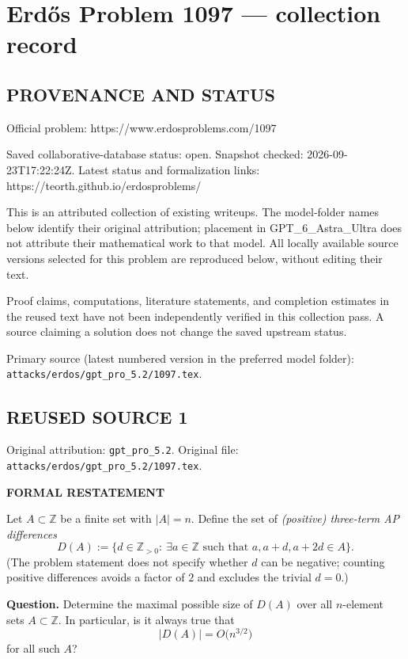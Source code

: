 \section*{Erd\H{o}s Problem 1097 --- collection record}

\subsection*{PROVENANCE AND STATUS}
Official problem: https://www.erdosproblems.com/1097

Saved collaborative-database status: open.
Snapshot checked: 2026-09-23T17:22:24Z.
Latest status and formalization links: https://teorth.github.io/erdosproblems/

This is an attributed collection of existing writeups. The model-folder names below identify their original attribution; placement in GPT\_6\_Astra\_Ultra does not attribute their mathematical work to that model. All locally available source versions selected for this problem are reproduced below, without editing their text.

Proof claims, computations, literature statements, and completion estimates in the reused text have not been independently verified in this collection pass. A source claiming a solution does not change the saved upstream status.

Primary source (latest numbered version in the preferred model folder): \texttt{attacks/erdos/gpt\_pro\_5.2/1097.tex}.

\subsection*{REUSED SOURCE 1}
Original attribution: \texttt{gpt\_pro\_5.2}.
Original file: \texttt{attacks/erdos/gpt\_pro\_5.2/1097.tex}.


\medskip
\noindent\textbf{FORMAL RESTATEMENT}

\smallskip
\noindent
Let $A\subset\mathbb{Z}$ be a finite set with $|A|=n$. Define the set of \emph{(positive) three-term AP differences}
\[
D(A):=\{d\in\mathbb{Z}_{>0}:\ \exists a\in\mathbb{Z}\text{ such that }a,a+d,a+2d\in A\}.
\]
(The problem statement does not specify whether $d$ can be negative; counting positive differences avoids a factor of $2$ and excludes the trivial $d=0$.)

\smallskip
\noindent
\textbf{Question.}
Determine the maximal possible size of $D(A)$ over all $n$-element sets $A\subset\mathbb{Z}$. In particular, is it always true that
\[
|D(A)|=O\bigl(n^{3/2}\bigr)
\]
for all such $A$?

